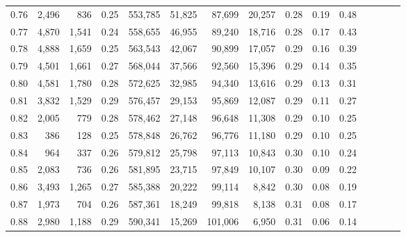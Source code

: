 \begin{tabular}{rrrcrrrrrrrrrrr}
0.76 &   2,496 &    836 &                                       0.25 &  553,785 &   51,825 &   87,699 &   20,257 &  0.28 &  0.19 &                         0.48 \\
0.77 &   4,870 &  1,541 &                                       0.24 &  558,655 &   46,955 &   89,240 &   18,716 &  0.28 &  0.17 &                         0.43 \\
0.78 &   4,888 &  1,659 &                                       0.25 &  563,543 &   42,067 &   90,899 &   17,057 &  0.29 &  0.16 &                         0.39 \\
0.79 &   4,501 &  1,661 &                                       0.27 &  568,044 &   37,566 &   92,560 &   15,396 &  0.29 &  0.14 &                         0.35 \\
0.80 &   4,581 &  1,780 &                                       0.28 &  572,625 &   32,985 &   94,340 &   13,616 &  0.29 &  0.13 &                         0.31 \\
0.81 &   3,832 &  1,529 &                                       0.29 &  576,457 &   29,153 &   95,869 &   12,087 &  0.29 &  0.11 &                         0.27 \\
0.82 &   2,005 &    779 &                                       0.28 &  578,462 &   27,148 &   96,648 &   11,308 &  0.29 &  0.10 &                         0.25 \\
0.83 &     386 &    128 &                                       0.25 &  578,848 &   26,762 &   96,776 &   11,180 &  0.29 &  0.10 &                         0.25 \\
0.84 &     964 &    337 &                                       0.26 &  579,812 &   25,798 &   97,113 &   10,843 &  0.30 &  0.10 &                         0.24 \\
0.85 &   2,083 &    736 &                                       0.26 &  581,895 &   23,715 &   97,849 &   10,107 &  0.30 &  0.09 &                         0.22 \\
0.86 &   3,493 &  1,265 &                                       0.27 &  585,388 &   20,222 &   99,114 &    8,842 &  0.30 &  0.08 &                         0.19 \\
0.87 &   1,973 &    704 &                                       0.26 &  587,361 &   18,249 &   99,818 &    8,138 &  0.31 &  0.08 &                         0.17 \\
0.88 &   2,980 &  1,188 &                                       0.29 &  590,341 &   15,269 &  101,006 &    6,950 &  0.31 &  0.06 &                         0.14 \\

\end{tabular}
